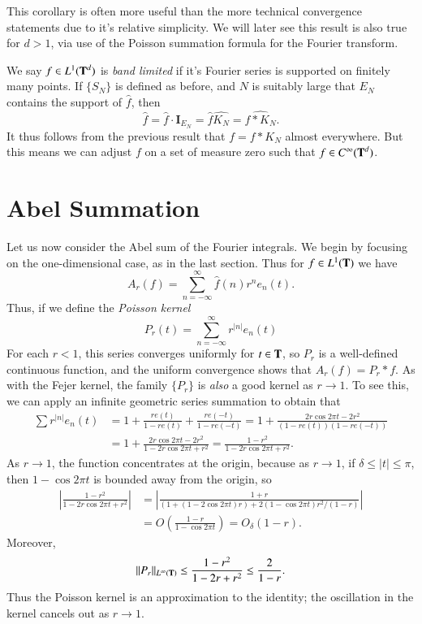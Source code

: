 This corollary is often more useful than the more technical convergence statements due to it's relative simplicity. We will later see this result is also true for $d > 1$, via use of the Poisson summation formula for the Fourier transform.

\begin{example}
    We say $f \in L^1(\operatorname{\mathbf{T}}^d)$ is \emph{band limited} if it's Fourier series is supported on finitely many points. If $\{ S_N \}$ is defined as before, and $N$ is suitably large that $E_N$ contains the support of $\widehat{f}$, then
    \[ \widehat{f} = \widehat{f} \cdot \mathbf{I}_{E_N} = \widehat{f} \widehat{K_N} = \widehat{f * K_N}. \]
    It thus follows from the previous result that $f = f * K_N$ almost everywhere. But this means we can adjust $f$ on a set of measure zero such that $f \in C^\infty(\operatorname{\mathbf{T}}^d)$.
\end{example}

\section{Abel Summation}

Let us now consider the Abel sum of the Fourier integrals. We begin by focusing on the one-dimensional case, as in the last section. Thus for $f \in L^1(\operatorname{\mathbf{T}})$ we have
%
\[ A_r(f) = \sum_{n = -\infty}^\infty \widehat{f}(n) r^n e_n(t). \]
%
Thus, if we define the {\it Poisson kernel}
%
\[ P_r(t) = \sum_{n = -\infty}^\infty r^{|n|} e_n(t) \]
%
For each $r < 1$, this series converges uniformly for $t \in \operatorname{\mathbf{T}}$, so $P_r$ is a well-defined continuous function, and the uniform convergence shows that $A_r(f) = P_r * f$. As with the Fejer kernel, the family $\{ P_r \}$ is \emph{also} a good kernel as $r \to 1$. To see this, we can apply an infinite geometric series summation to obtain that
%
\begin{align*}
    \sum r^{|n|} e_n(t) &= 1 + \frac{re(t)}{1 - re(t)} + \frac{re(-t)}{1 - re(-t)} = 1 + \frac{2r \cos 2 \pi t - 2r^2}{(1 - re(t))(1 - re(-t))}\\
    &= 1 + \frac{2r \cos 2\pi t - 2r^2}{1 - 2r \cos 2\pi t + r^2} = \frac{1 - r^2}{1 - 2r \cos 2 \pi t + r^2}.
\end{align*}
%
As $r \to 1$, the function concentrates at the origin, because as $r \to 1$, if $\delta \leq |t| \leq \pi$, then $1 - \cos 2\pi t$ is bounded away from the origin, so
%
\begin{align*}
    \left| \frac{1 - r^2}{1 - 2r \cos 2\pi t + r^2} \right| &= \left| \frac{1 + r}{(1+(1-2\cos 2\pi t)r) + 2(1 - \cos 2\pi t) r^2/(1-r)} \right|\\
    &= O \left( \frac{1 - r}{1 - \cos 2\pi t} \right) = O_\delta(1 - r).
\end{align*}
%
Moreover,
%
\[ \| P_r \|_{L^\infty(\operatorname{\mathbf{T}})} \leq \frac{1 - r^2}{1 - 2r + r^2} \leq \frac{2}{1 - r}. \]
%
Thus the Poisson kernel is an approximation to the identity; the oscillation in the kernel cancels out as $r \to 1$.

